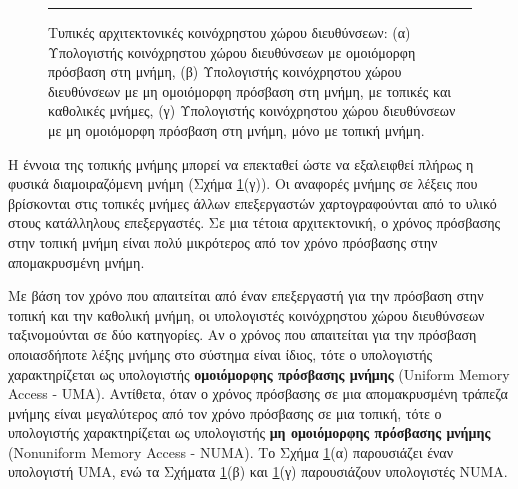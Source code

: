 \documentclass[12pt,a4paper]{article} %
\begin{document}
\begin{figure}[H]
\noindent\rule{\textwidth}{0.2pt}
\caption{Τυπικές αρχιτεκτονικές κοινόχρηστου χώρου διευθύνσεων:
(α) Υπολογιστής κοινόχρηστου χώρου διευθύνσεων με ομοιόμορφη πρόσβαση στη μνήμη,
(β) Υπολογιστής κοινόχρηστου χώρου διευθύνσεων με μη ομοιόμορφη πρόσβαση στη μνήμη, με τοπικές και καθολικές μνήμες,
(γ) Υπολογιστής κοινόχρηστου χώρου διευθύνσεων με μη ομοιόμορφη πρόσβαση στη μνήμη, μόνο με τοπική μνήμη.}
\label{fig:graph32}
\end{figure}
\vspace{0.3cm}

Η έννοια της τοπικής μνήμης μπορεί να επεκταθεί ώστε να εξαλειφθεί πλήρως 
η φυσικά διαμοιραζόμενη μνήμη {(}Σχήμα \ref{fig:graph32}(γ){)}. Οι αναφορές μνήμης σε λέξεις 
που βρίσκονται στις τοπικές μνήμες άλλων επεξεργαστών χαρτογραφούνται από 
το υλικό στους κατάλληλους επεξεργαστές. Σε μια τέτοια 
αρχιτεκτονική, ο χρόνος πρόσβασης στην τοπική μνήμη είναι πολύ μικρότερος 
από τον χρόνο πρόσβασης στην απομακρυσμένη μνήμη.

Με βάση τον χρόνο που απαιτείται από έναν επεξεργαστή για την πρόσβαση στην 
τοπική και την καθολική μνήμη, οι υπολογιστές κοινόχρηστου χώρου διευθύνσεων 
ταξινομούνται σε δύο κατηγορίες. Αν ο χρόνος που απαιτείται για την 
πρόσβαση οποιασδήποτε λέξης μνήμης στο σύστημα είναι ίδιος, τότε ο 
υπολογιστής χαρακτηρίζεται ως υπολογιστής \textbf{ομοιόμορφης πρόσβασης 
μνήμης} (Uniform Memory Access - UMA). Αντίθετα, όταν ο χρόνος 
πρόσβασης σε μια απομακρυσμένη τράπεζα μνήμης είναι μεγαλύτερος από τον 
χρόνο πρόσβασης σε μια τοπική, τότε ο υπολογιστής χαρακτηρίζεται ως 
υπολογιστής \textbf{μη ομοιόμορφης πρόσβασης μνήμης} (Nonuniform 
Memory Access - NUMA). Το Σχήμα \ref{fig:graph32}(α) παρουσιάζει έναν υπολογιστή UMA, 
ενώ τα Σχήματα \ref{fig:graph32}(β) και \ref{fig:graph32}(γ) παρουσιάζουν υπολογιστές NUMA.
\end{document}
